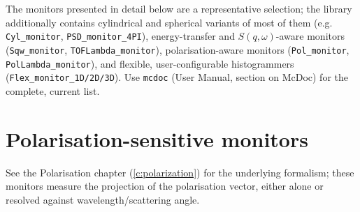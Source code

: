 The monitors presented in detail below are a representative selection;
the library additionally contains cylindrical and spherical variants of
most of them (e.g. \texttt{Cyl\_monitor}, \texttt{PSD\_monitor\_4PI}),
energy-transfer and $S(q,\omega)$-aware monitors
(\texttt{Sqw\_monitor}, \texttt{TOFLambda\_monitor}), polarisation-aware
monitors (\texttt{Pol\_monitor}, \texttt{PolLambda\_monitor}), and
flexible, user-configurable histogrammers (\texttt{Flex\_monitor\_1D/2D/3D}).
Use \verb+mcdoc+ (User Manual, section on McDoc) for the complete,
current list.

\newpage














\newpage


\newpage


\section{Polarisation-sensitive monitors}

See the Polarisation chapter (\ref{c:polarization}) for the underlying
formalism; these monitors measure the projection of the polarisation
vector, either alone or resolved against wavelength/scattering angle.








